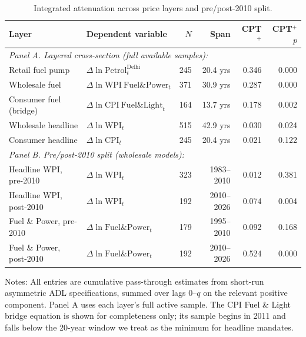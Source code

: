\begin{table}[t]
\centering
\caption{Integrated attenuation across price layers and pre/post-2010 split.}
\label{tab:summary}
\footnotesize
\setlength{\tabcolsep}{4pt}
\begin{threeparttable}
\begin{tabular}{l l r r r r}
\toprule
Layer & Dependent variable & $N$ & Span & CPT$^+$ & CPT$^+$ $p$ \\
\midrule
\multicolumn{6}{l}{\emph{Panel A. Layered cross-section (full available samples):}} \\
Retail fuel pump      & $\Delta \ln \mathrm{Petrol}^{\mathrm{Delhi}}_t$    & 245 & 20.4 yrs & 0.346 & 0.000 \\
Wholesale fuel        & $\Delta \ln \mathrm{WPI\ Fuel\&Power}_t$           & 371 & 30.9 yrs & 0.287 & 0.000 \\
Consumer fuel (bridge)& $\Delta \ln \mathrm{CPI\ Fuel\&Light}_t$           & 164 & 13.7 yrs & 0.178 & 0.002 \\
Wholesale headline    & $\Delta \ln \mathrm{WPI}_t$                        & 515 & 42.9 yrs & 0.030 & 0.024 \\
Consumer headline     & $\Delta \ln \mathrm{CPI}_t$                        & 245 & 20.4 yrs & 0.021 & 0.122 \\
\midrule
\multicolumn{6}{l}{\emph{Panel B. Pre/post-2010 split (wholesale models):}} \\
Headline WPI, pre-2010   & $\Delta \ln \mathrm{WPI}_t$           & 323 & 1983--2010 & 0.012 & 0.381 \\
Headline WPI, post-2010  & $\Delta \ln \mathrm{WPI}_t$           & 192 & 2010--2026 & 0.074 & 0.004 \\
Fuel \& Power, pre-2010  & $\Delta \ln \mathrm{Fuel\&Power}_t$   & 179 & 1995--2010 & 0.092 & 0.168 \\
Fuel \& Power, post-2010 & $\Delta \ln \mathrm{Fuel\&Power}_t$   & 192 & 2010--2026 & 0.524 & 0.000 \\
\bottomrule
\end{tabular}
\begin{tablenotes}\footnotesize
\item Notes: All entries are cumulative pass-through estimates from short-run asymmetric ADL specifications, summed over lags 0--$q$ on the relevant positive component. Panel A uses each layer's full active sample. The CPI Fuel \& Light bridge equation is shown for completeness only; its sample begins in 2011 and falls below the 20-year window we treat as the minimum for headline mandates.
\end{tablenotes}
\end{threeparttable}
\end{table}
